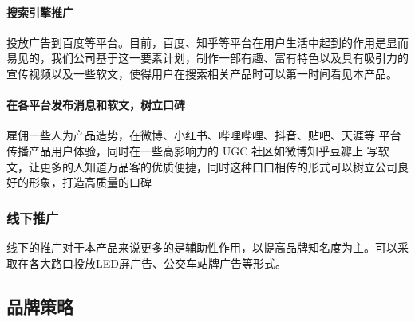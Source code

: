 \documentclass[UTF8]{ctexart}
\begin{document}
\paragraph{搜索引擎推广}


投放广告到百度等平台。目前，百度、知乎等平台在用户生活中起到的作用是显而易见的，我们公司基于这一要素计划，制作一部有趣、富有特色以及具有吸引力的宣传视频以及一些软文，使得用户在搜索相关产品时可以第一时间看见本产品。
\paragraph{在各平台发布消息和软文，树立口碑}


雇佣一些人为产品造势，在微博、小红书、哔哩哔哩、抖音、贴吧、天涯等 平台传播产品用户体验，同时在一些高影响力的 UGC 社区如微博知乎豆瓣上 写软文，让更多的人知道万品客的优质便捷，同时这种口口相传的形式可以树立公司良好的形象，打造高质量的口碑
\subsubsection{线下推广}
线下的推广对于本产品来说更多的是辅助性作用，以提高品牌知名度为主。可以采取在各大路口投放LED屏广告、公交车站牌广告等形式。
\subsection{品牌策略}
\end{document}
